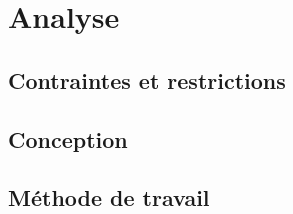 \part{Analyse}

\clearemptydoublepage
\chapter{Contraintes et restrictions}
\label{chapter:les_contraintes}
\minitoc



\clearemptydoublepage
\chapter{Conception}
\minitoc




\clearemptydoublepage
\chapter{Méthode de travail}
\minitoc

